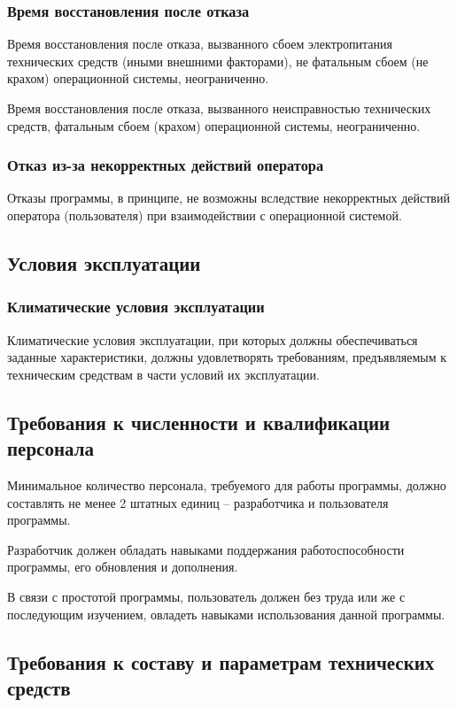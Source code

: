 \documentclass[14pt]{extarticle}
\begin{document}
\subsubsection{Время восстановления после отказа}
Время восстановления после отказа, вызванного сбоем электропитания технических средств (иными внешними факторами), не фатальным сбоем (не крахом) операционной системы, неограниченно. 
\par Время восстановления после отказа, вызванного неисправностью технических средств, фатальным сбоем (крахом) операционной системы, неограниченно.

\subsubsection {Отказ из-за некорректных действий оператора}   
Отказы программы, в принципе, не возможны вследствие некорректных действий оператора (пользователя) при взаимодействии с операционной системой. 

\subsection {Условия эксплуатации}
\subsubsection {Климатические условия эксплуатации}
Климатические условия эксплуатации, при которых должны обеспечиваться заданные характеристики, должны удовлетворять требованиям, предъявляемым к техническим средствам в части условий их эксплуатации.

\subsection {Требования к численности и квалификации персонала}
Минимальное количество персонала, требуемого для работы программы, должно составлять не менее 2 штатных единиц – разработчика и пользователя программы.
\par Разработчик должен обладать навыками поддержания работоспособности программы, его обновления и дополнения.
\par В связи с простотой программы, пользователь должен без труда или же с последующим изучением, овладеть навыками использования данной программы.

\subsection {Требования к составу и параметрам технических средств}
\end{document}
